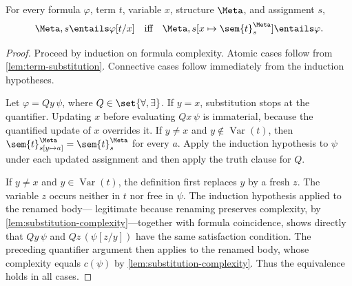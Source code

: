 \begin{theorem}
\label{thm:fol-substitution}
For every formula \(\varphi\), term \(t\), variable \(x\), structure
\(\Meta\), and assignment \(s\),
\[
 \Meta,s\entails\varphi[t/x]
 \quad\text{iff}\quad
 \Meta,s[x\mapsto\sem{t}^{\Meta}_s]\entails\varphi.
\]
\end{theorem}
\begin{proof}
Proceed by induction on formula complexity.  Atomic cases follow from
\cref{lem:term-substitution}.  Connective cases follow immediately from the
induction hypotheses.

Let \(\varphi=Qy\,\psi\), where
\(Q\in\set{\forall,\exists}\).  If \(y=x\), substitution stops at the
quantifier.  Updating \(x\) before evaluating \(Qx\,\psi\) is immaterial,
because the quantified update of \(x\) overrides it.  If \(y\ne x\) and
\(y\notin\operatorname{Var}(t)\), then
\(\sem{t}^{\Meta}_{s[y\mapsto a]}=\sem{t}^{\Meta}_s\) for every \(a\).
Apply the induction hypothesis to \(\psi\) under each updated assignment and
then apply the truth clause for \(Q\).

If \(y\ne x\) and \(y\in\operatorname{Var}(t)\), the definition first replaces \(y\) by a
fresh \(z\).  The variable \(z\) occurs neither in \(t\) nor free in
\(\psi\).  The induction hypothesis applied to the renamed body---
legitimate because renaming preserves complexity, by
\cref{lem:substitution-complexity}---together with formula coincidence,
shows directly that
\(Qy\,\psi\) and \(Qz\,(\psi[z/y])\) have the same satisfaction condition.
The preceding quantifier argument then applies to the renamed body, whose
complexity equals \(c(\psi)\) by \cref{lem:substitution-complexity}.  Thus
the equivalence holds in all cases.
\end{proof}

